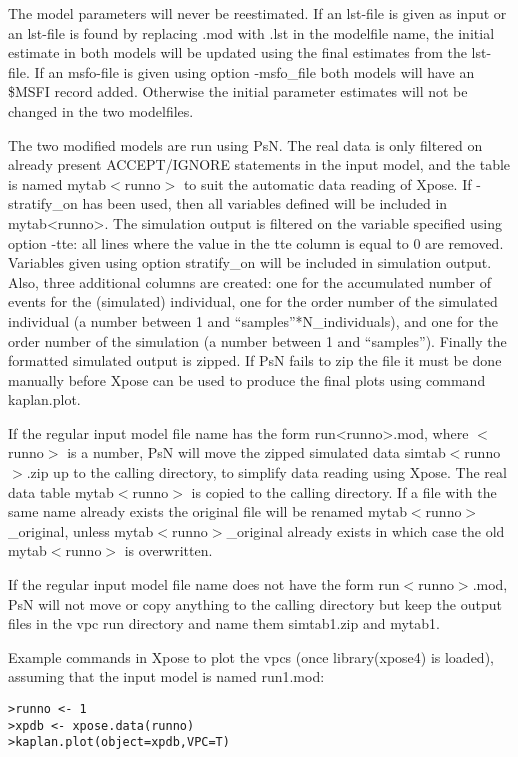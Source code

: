 The model parameters will never be reestimated. If an lst-file is given as input or an lst-file is found by replacing .mod with .lst in the modelfile name, the initial estimate in both models will be updated using the final estimates from the lst-file. If an msfo-file is given using option -msfo\_file both models will have an \$MSFI record added. Otherwise the initial parameter estimates will not be changed in the two modelfiles. 

The two modified models are run using PsN. The real data is only filtered on already present ACCEPT/IGNORE statements in the input model, and the table is named mytab$<$runno$>$ to suit the automatic data reading of Xpose. If -stratify\_on has been used, then all variables defined will be included in mytab<runno>. The simulation output is filtered on the variable specified using option -tte: all lines where the value in the tte column is equal to 0 are removed. Variables given using option stratify\_on will be included in simulation output. Also, three additional columns are created: one for the accumulated number of events for the (simulated) individual, one for the order number of the simulated individual (a number between 1 and “samples”*N\_individuals), and one for the order number of the simulation (a number between 1 and “samples”).  Finally the formatted simulated output is zipped. If PsN fails to zip the file it must be done manually before Xpose can be used to produce the final plots using command kaplan.plot.

If the regular input model file name has the form run<runno>.mod, where $<$runno$>$ is a number, PsN will move the zipped simulated data simtab$<$runno$>$.zip up to the calling directory, to simplify data reading using Xpose. The real data table mytab$<$runno$>$ is copied to the calling directory. If a file with the same name already exists the original file will be renamed mytab$<$runno$>$\_original, unless mytab$<$runno$>$\_original already exists in which case the old mytab$<$runno$>$ is overwritten. 

If the regular input model file name does not have the form run$<$runno$>$.mod, PsN will not move or copy anything to the calling directory but keep the output files in the vpc run directory and name them simtab1.zip and mytab1. 

Example commands in Xpose to plot the vpcs (once library(xpose4) is loaded), assuming that the input model is named run1.mod:
\begin{verbatim}
>runno <- 1
>xpdb <- xpose.data(runno)
>kaplan.plot(object=xpdb,VPC=T)
\end{verbatim}

